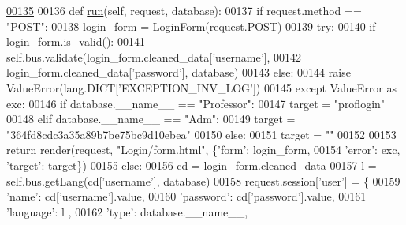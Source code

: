\begin{DoxyCode}
\hypertarget{classLogin_1_1LoginUnit_1_1UiLogin_l00135}{}\hyperlink{classLogin_1_1LoginUnit_1_1UiLogin_a9cd61a78d5ab0d201051ccf5898f86bc}{00135} 
00136     \textcolor{keyword}{def }\hyperlink{classLogin_1_1LoginUnit_1_1UiLogin_a9cd61a78d5ab0d201051ccf5898f86bc}{run}(self, request, database):
00137         \textcolor{keywordflow}{if} request.method == \textcolor{stringliteral}{"POST"}:
00138             login\_form = \hyperlink{classLogin_1_1forms_1_1LoginForm}{LoginForm}(request.POST)
00139             \textcolor{keywordflow}{try}: 
00140                 \textcolor{keywordflow}{if} login\_form.is\_valid():
00141                     self.bus.validate(login\_form.cleaned\_data[\textcolor{stringliteral}{'username'}],
00142                         login\_form.cleaned\_data[\textcolor{stringliteral}{'password'}], database)
00143                 \textcolor{keywordflow}{else}:
00144                     \textcolor{keywordflow}{raise} ValueError(lang.DICT[\textcolor{stringliteral}{'EXCEPTION\_INV\_LOG'}])
00145             \textcolor{keywordflow}{except} ValueError \textcolor{keyword}{as} exc:
00146                 \textcolor{keywordflow}{if} database.\_\_name\_\_ == \textcolor{stringliteral}{"Professor"}:
00147                     target = \textcolor{stringliteral}{"proflogin"}
00148                 \textcolor{keywordflow}{elif} database.\_\_name\_\_ == \textcolor{stringliteral}{"Adm"}:
00149                     target = \textcolor{stringliteral}{"364fd8cdc3a35a89b7be75bc9d10ebea"}
00150                 \textcolor{keywordflow}{else}:
00151                     target = \textcolor{stringliteral}{""}
00152 
00153                 \textcolor{keywordflow}{return} render(request, \textcolor{stringliteral}{"Login/form.html"}, \{\textcolor{stringliteral}{'form'}: login\_form, 
00154                     \textcolor{stringliteral}{'error'}: exc, \textcolor{stringliteral}{'target'}: target\})
00155             \textcolor{keywordflow}{else}:
00156                 cd = login\_form.cleaned\_data
00157                 l = self.bus.getLang(cd[\textcolor{stringliteral}{'username'}], database)
00158                 request.session[\textcolor{stringliteral}{'user'}] = \{
00159                                 \textcolor{stringliteral}{'name'}: cd[\textcolor{stringliteral}{'username'}].value,
00160                                 \textcolor{stringliteral}{'password'}: cd[\textcolor{stringliteral}{'password'}].value,
00161                                 \textcolor{stringliteral}{'language'}: l ,
00162                                 \textcolor{stringliteral}{'type'}: database.\_\_name\_\_,

\end{DoxyCode}
